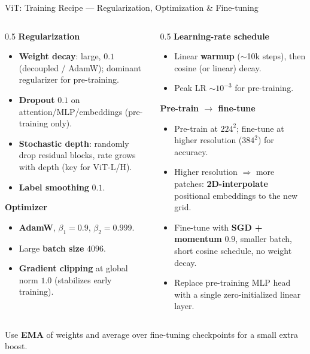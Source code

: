 \begin{frame}{ViT: Training Recipe --- Regularization, Optimization \& Fine-tuning}

  \begin{columns}[T]
    \begin{column}{0.5\textwidth}
      \textbf{Regularization}
      \begin{itemize}
        \item \textbf{Weight decay}: large, $0.1$ (decoupled / AdamW); dominant regularizer for pre-training.
        \item \textbf{Dropout} $0.1$ on attention/MLP/embeddings (pre-training only).
        \item \textbf{Stochastic depth}: randomly drop residual blocks, rate grows with depth (key for ViT-L/H).
        \item \textbf{Label smoothing} $0.1$.
      \end{itemize}

      \vspace{0.4em}
      \textbf{Optimizer}
      \begin{itemize}
        \item \textbf{AdamW}, $\beta_1{=}0.9$, $\beta_2{=}0.999$.
        \item Large \textbf{batch size} $4096$.
        \item \textbf{Gradient clipping} at global norm $1.0$ (stabilizes early training).
      \end{itemize}
    \end{column}
    \begin{column}{0.5\textwidth}
      \textbf{Learning-rate schedule}
      \begin{itemize}
        \item Linear \textbf{warmup} ($\sim$10k steps), then cosine (or linear) decay.
        \item Peak LR $\sim 10^{-3}$ for pre-training.
      \end{itemize}

      \vspace{0.4em}
      \textbf{Pre-train $\rightarrow$ fine-tune}
      \begin{itemize}
        \item Pre-train at $224^2$; fine-tune at higher resolution ($384^2$) for accuracy.
        \item Higher resolution $\Rightarrow$ more patches: \textbf{2D-interpolate} positional embeddings to the new grid.
        \item Fine-tune with \textbf{SGD + momentum} $0.9$, smaller batch, short cosine schedule, no weight decay.
        \item Replace pre-training MLP head with a single zero-initialized linear layer.
      \end{itemize}
    \end{column}
  \end{columns}

  \vspace{0.4em}
  {\footnotesize Use \textbf{EMA} of weights and average over fine-tuning checkpoints for a small extra boost.}
\end{frame}

